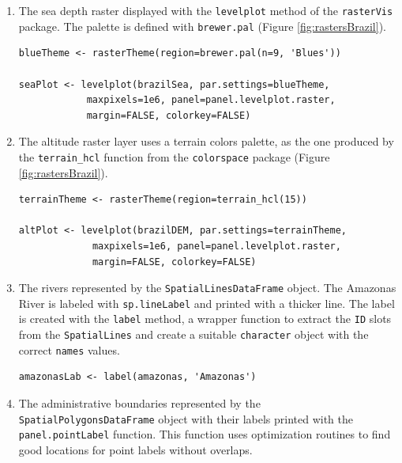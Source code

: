 \documentclass[smallroyalvopaper]{memoir}
\begin{document}
\begin{enumerate}
\item The sea depth raster displayed with the \texttt{levelplot} method of the
\texttt{rasterVis} package. The palette is defined with \texttt{brewer.pal}
(Figure \ref{fig:rastersBrazil}).
\lstset{language=R,numbers=none}
\begin{lstlisting}
blueTheme <- rasterTheme(region=brewer.pal(n=9, 'Blues'))

seaPlot <- levelplot(brazilSea, par.settings=blueTheme,
		    maxpixels=1e6, panel=panel.levelplot.raster,
		    margin=FALSE, colorkey=FALSE)
\end{lstlisting}


\item The altitude raster layer uses a terrain colors palette, as the one
produced by the \texttt{terrain\_hcl} function from the \texttt{colorspace} package
\cite{Ihaka.Murrell.ea2011} (Figure \ref{fig:rastersBrazil}).
\lstset{language=R,numbers=none}
\begin{lstlisting}
terrainTheme <- rasterTheme(region=terrain_hcl(15))

altPlot <- levelplot(brazilDEM, par.settings=terrainTheme,
		     maxpixels=1e6, panel=panel.levelplot.raster,
		     margin=FALSE, colorkey=FALSE)
\end{lstlisting}


\item The rivers represented by the \texttt{SpatialLinesDataFrame} object. The
Amazonas River is labeled with \texttt{sp.lineLabel} and printed with a
thicker line. The label is created with the \texttt{label} method, a
wrapper function to extract the \texttt{ID} slots from the \texttt{SpatialLines}
and create a suitable \texttt{character} object with the correct \texttt{names}
values.

\lstset{language=R,numbers=none}
\begin{lstlisting}
amazonasLab <- label(amazonas, 'Amazonas')
\end{lstlisting}

\item The administrative boundaries represented by the
\texttt{SpatialPolygonsDataFrame} object with their labels printed with
the \texttt{panel.pointLabel} function. This function uses optimization
routines to find good locations for point labels without overlaps.


\end{enumerate}
\end{document}
